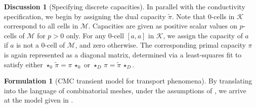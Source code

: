 \documentclass{elsarticle}
\theoremstyle{definition}
\newtheorem{formulation}[theorem]{Formulation}
\newtheorem{discussion}[theorem]{Discussion}
\begin{document}
\begin{discussion}[Specifying discrete capacities]
  In parallel with the conductivity specification, we begin by assigning the dual capacity $\tilde{\pi}$. Note that $0$-cells in $\mathcal{K}$ correspond to all cells in $\mathcal{M}$.
  Capacities are given as positive scalar values on $p$-cells of $\mathcal{M}$ for $p>0$ only. For any $0$-cell $[a, a]$ in $\mathcal{K}$, we assign the capacity of $a$ if $a$ is not a $0$-cell of $\mathcal{M}$, and zero otherwise.  The corresponding primal capacity $\pi$ is again represented as a diagonal matrix, determined via a least-squares fit to satisfy either
  $\star_0 \, \tilde{\pi} = \pi \, \star_0$ or
  $\star_D \, \pi = \tilde{\pi} \, \star_D$.
\end{discussion}

\begin{formulation}[CMC transient model for transport phenomena]
  By translating  into the language of combinatorial meshes, under the assumptions of , we arrive at the model given in .
\end{formulation}
\end{document}
